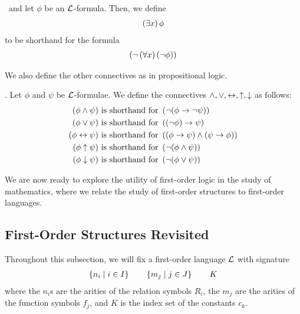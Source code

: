 \begin{boxdefinition}
    \ and let $\phi$ be an $\mathcal{L}$-formula. Then, we define
    \begin{align*}
        \left( \exists x \right) \phi
    \end{align*}
    to be shorthand for the formula
    \begin{align*}
        \left( \neg\left( \forall x \right)\left( \neg \phi \right) \right)
    \end{align*}
\end{boxdefinition}

We also define the other connectives as in propositional logic.

\begin{boxdefinition}[Connectives]
    . Let $\phi$ and $\psi$ be $\mathcal{L}$-formulae. We define the connectives $\land, \lor, \leftrightarrow, \uparrow, \downarrow$ as follows:
    \begin{align*}
        \left( \phi \land \psi \right) &\text{ is shorthand for } \left( \neg (\phi \to \neg \psi) \right) \\
        \left( \phi \lor \psi \right) &\text{ is shorthand for } \left( \left( \neg \phi \right) \to \psi \right) \\
        \left( \phi \leftrightarrow \psi \right) &\text{ is shorthand for } \left( (\phi \to \psi) \land (\psi \to \phi) \right) \\
        \left( \phi \uparrow \psi \right) &\text{ is shorthand for } \left( \neg (\phi \land \psi) \right) \\
        \left( \phi \downarrow \psi \right) &\text{ is shorthand for } \left( \neg (\phi \lor \psi) \right)
    \end{align*}
\end{boxdefinition}

We are now ready to explore the utility of first-order logic in the study of mathematics, where we relate the study of first-order structures to first-order languages.

\subsection{First-Order Structures Revisited}

Throughout this subsection, we will fix a first-order language $\mathcal{L}$ with signature
\begin{align*}
    \left\{ n_i \; \middle\vert \; i \in I \right\}
    \qquad
    \left\{ m_j \; \middle\vert \; j \in J \right\}
    \qquad
    K
\end{align*}
where the $n_i$s are the arities of the relation symbols $R_i$, the $m_j$ are the arities of the function symbols $f_j$, and $K$ is the index set of the constants $c_k$.

